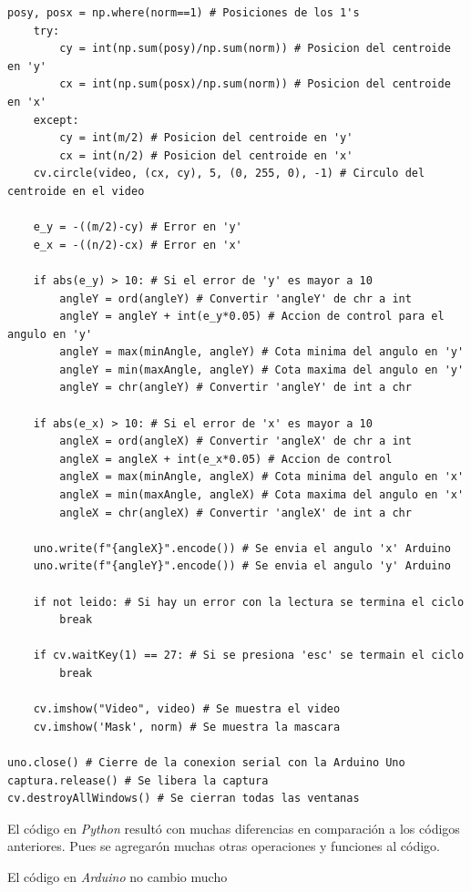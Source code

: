 \documentclass[12pt, oneside]{article}
\begin{document}
{\begin{lstlisting}[style=pythonScript]
    posy, posx = np.where(norm==1) # Posiciones de los 1's
    try:
        cy = int(np.sum(posy)/np.sum(norm)) # Posicion del centroide en 'y'
        cx = int(np.sum(posx)/np.sum(norm)) # Posicion del centroide en 'x'
    except:
        cy = int(m/2) # Posicion del centroide en 'y'
        cx = int(n/2) # Posicion del centroide en 'x'
    cv.circle(video, (cx, cy), 5, (0, 255, 0), -1) # Circulo del centroide en el video

    e_y = -((m/2)-cy) # Error en 'y'
    e_x = -((n/2)-cx) # Error en 'x'

    if abs(e_y) > 10: # Si el error de 'y' es mayor a 10
        angleY = ord(angleY) # Convertir 'angleY' de chr a int
        angleY = angleY + int(e_y*0.05) # Accion de control para el angulo en 'y'
        angleY = max(minAngle, angleY) # Cota minima del angulo en 'y'
        angleY = min(maxAngle, angleY) # Cota maxima del angulo en 'y'
        angleY = chr(angleY) # Convertir 'angleY' de int a chr

    if abs(e_x) > 10: # Si el error de 'x' es mayor a 10
        angleX = ord(angleX) # Convertir 'angleX' de chr a int
        angleX = angleX + int(e_x*0.05) # Accion de control
        angleX = max(minAngle, angleX) # Cota minima del angulo en 'x'
        angleX = min(maxAngle, angleX) # Cota maxima del angulo en 'x'
        angleX = chr(angleX) # Convertir 'angleX' de int a chr

    uno.write(f"{angleX}".encode()) # Se envia el angulo 'x' Arduino
    uno.write(f"{angleY}".encode()) # Se envia el angulo 'y' Arduino

    if not leido: # Si hay un error con la lectura se termina el ciclo
        break

    if cv.waitKey(1) == 27: # Si se presiona 'esc' se termain el ciclo
        break

    cv.imshow("Video", video) # Se muestra el video
    cv.imshow('Mask', norm) # Se muestra la mascara

uno.close() # Cierre de la conexion serial con la Arduino Uno
captura.release() # Se libera la captura
cv.destroyAllWindows() # Se cierran todas las ventanas
    \end{lstlisting}

    \newpage
    \hspace{0.5cm} El código en \emph{Python} resultó con muchas diferencias en
    comparación a los códigos anteriores. Pues se agregarón muchas otras operaciones y
    funciones al código.

    \hspace{0.5cm} El código en \emph{Arduino} no cambio mucho

}
\end{document}
